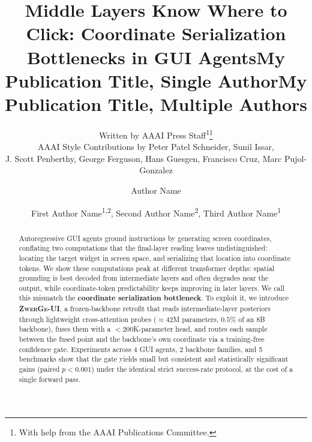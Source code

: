 \documentclass[letterpaper]{article} %
\title{Middle Layers Know Where to Click: Coordinate Serialization Bottlenecks in GUI Agents}
\author{
 Written by AAAI Press Staff\textsuperscript{\rm 1}\thanks{With help from the AAAI Publications Committee.}\\
 AAAI Style Contributions by Peter Patel Schneider,
 Sunil Issar,\\
 J. Scott Penberthy,
 George Ferguson,
 Hans Guesgen,
 Francisco Cruz\equalcontrib\corresponding,
 Marc Pujol-Gonzalez\equalcontrib\corresponding
}
\title{My Publication Title, Single Author}
\author {
 Author Name
}
\title{My Publication Title, Multiple Authors}
\author {
 First Author Name\textsuperscript{\rm 1,\rm 2}\equalcontrib,
 Second Author Name\textsuperscript{\rm 2}\equalcontrib,
 Third Author Name\textsuperscript{\rm 1}\corresponding
}
\begin{document}
\maketitle

\begin{abstract}
Autoregressive GUI agents ground instructions by generating screen coordinates, conflating two computations that the final-layer reading leaves undistinguished: locating the target widget in screen space, and serializing that location into coordinate tokens.
We show these computations peak at different transformer depths: spatial grounding is best decoded from intermediate layers and often degrades near the output, while coordinate-token predictability keeps improving in later layers.
We call this mismatch the \textbf{coordinate serialization bottleneck}.
To exploit it, we introduce \textbf{\textsc{ZwerGe-UI}}, a frozen-backbone retrofit that reads intermediate-layer posteriors through lightweight cross-attention probes (${\approx}42$M parameters, $0.5\%$ of an 8B backbone), fuses them with a ${<}200$K-parameter head, and routes each sample between the fused point and the backbone's own coordinate via a training-free confidence gate.
Experiments across 4 GUI agents, 2 backbone families, and 5 benchmarks show that the gate yields small but consistent and statistically significant gains (paired $p{<}0.001$) under the identical strict success-rate protocol, at the cost of a single forward pass.
\end{abstract}








%






% 

\end{document}
